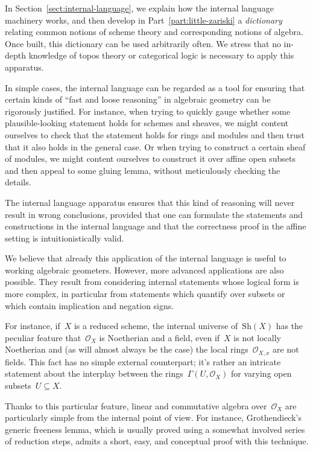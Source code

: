 \documentclass[10pt,reqno,a4paper]{amsbook}
\theoremstyle{definition}
\theoremstyle{plain}
\theoremstyle{remark}
\renewcommand{\O}{\mathcal{O}}
\newcommand{\Sh}{\mathrm{Sh}}
\newcommand{\?}{\,{:}\,}
\renewcommand{\_}{\mathpunct{.}\,}
\begin{document}
{In Section~\ref{sect:internal-language}, we explain how the internal language
machinery works, and then develop in Part~\ref{part:little-zariski} a
\emph{dictionary} relating common notions of scheme theory and corresponding
notions of algebra. Once built, this dictionary can be used arbitrarily often.
We stress that no in-depth knowledge of topos theory or categorical logic is
necessary to apply this apparatus.

In simple cases, the internal language can be regarded as a tool for ensuring
that certain kinds of ``fast and loose reasoning'' in algebraic geometry can be
rigorously justified. For instance, when trying to quickly gauge whether some
plausible-looking statement holds for schemes and sheaves, we might content
ourselves to check that the statement holds for rings and modules and then trust
that it also holds in the general case. Or when trying to construct a certain
sheaf of modules, we might content ourselves to construct it over affine open
subsets and then appeal to some gluing lemma, without meticulously checking the
details.

The internal language apparatus ensures that this kind of reasoning will never
result in wrong conclusions, provided that one can formulate the statements and
constructions in the internal language and that the correctness proof in the
affine setting is intuitionistically valid.

We believe that already this application of the internal language is useful to
working algebraic geometers. However, more advanced applications are also
possible. They result from considering internal statements whose logical form
is more complex, in particular from statements which quantify over subsets or which
contain implication and negation signs.

For instance, if~$X$ is a reduced scheme,
the internal universe of~$\Sh(X)$ has the peculiar feature that~$\O_X$ is
Noetherian and a field, even if~$X$ is not locally Noetherian and (as will
almost always be the case) the local rings~$\O_{X,x}$ are not fields. This fact
has no simple external counterpart; it's rather an intricate statement about
the interplay between the rings~$\Gamma(U, \O_X)$ for varying open subsets~$U
\subseteq X$.

Thanks to this particular feature, linear and commutative algebra over~$\O_X$
are particularly simple from the
internal point of view. For instance, Grothendieck's generic freeness lemma,
which is usually proved using a somewhat involved series of reduction steps,
admits a short, easy, and conceptual proof with this technique.

}
\end{document}
